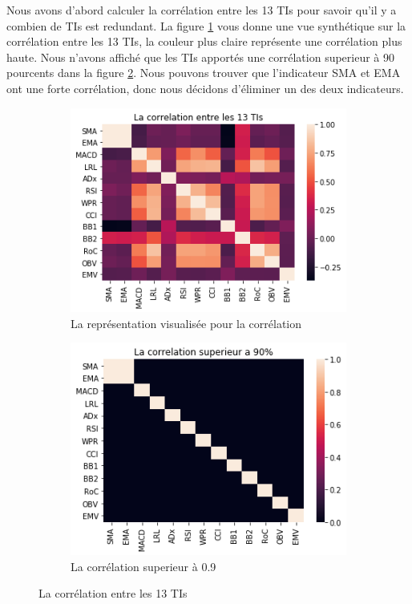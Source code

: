 Nous avons d'abord calculer la corrélation entre les 13 TIs pour savoir qu'il y a combien de TIs est redundant. La figure \ref{fig:corr} vous donne une vue synthétique sur la corrélation entre les 13 TIs, la couleur plus claire représente une corrélation plus haute. Nous n'avons affiché que les TIs apportés une corrélation superieur à 90 pourcents dans la figure \ref{fig:corr_s}. Nous pouvons trouver que l'indicateur SMA et EMA ont une forte corrélation, donc nous décidons d'éliminer un des deux indicateurs. \\

\begin{figure}[H]
	\centering
	\begin{subfigure}{.5\textwidth}
	\includegraphics[width=.9\linewidth, scale=0.2]
	{plot/Corr.png}
	\caption{La représentation visualisée pour la corrélation}
	\label{fig:corr}
	\end{subfigure}%
	\begin{subfigure}{.5\textwidth}
	\centering
	\includegraphics[width=.9\linewidth, scale=0.2]
	{plot/corr_s.png}
	\caption{La corrélation superieur à 0.9}
	\label{fig:corr_s}
	\end{subfigure}
\caption{La corrélation entre les 13 TIs}
\label{fig:correlation}
\end{figure}

